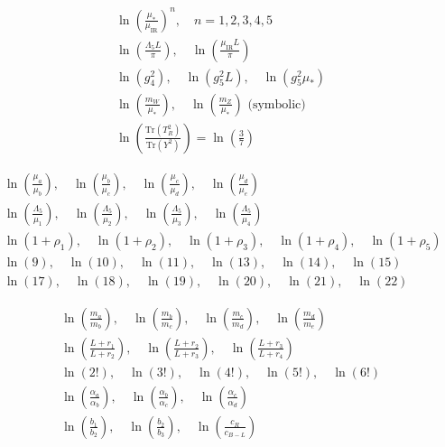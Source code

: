 \documentclass[11pt,a4paper]{article}
\theoremstyle{definition}
\begin{document}
\begin{align}
\label{eq:log_ext_16}
&\ln\left(\frac{\mu_*}{\mu_{\text{IR}}}\right)^n, \quad n = 1, 2, 3, 4, 5 \\
\label{eq:log_ext_17}
&\ln\left(\frac{\Lambda_5 L}{\pi}\right), \quad \ln\left(\frac{\mu_{\text{IR}} L}{\pi}\right) \\
\label{eq:log_ext_18}
&\ln(g_4^2), \quad \ln(g_5^2 L), \quad \ln(g_5^2\mu_*) \\
\label{eq:log_ext_19}
&\ln\left(\frac{m_W}{\mu_*}\right), \quad \ln\left(\frac{m_Z}{\mu_*}\right) \text{ (symbolic)} \\
\label{eq:log_ext_20}
&\ln\left(\frac{\text{Tr}(T^2_R)}{\text{Tr}(Y^2)}\right) = \ln\left(\frac{3}{7}\right)
\end{align}

\begin{align}
\label{eq:log_ext_21}
&\ln\left(\frac{\mu_a}{\mu_b}\right), \quad \ln\left(\frac{\mu_b}{\mu_c}\right), \quad \ln\left(\frac{\mu_c}{\mu_d}\right), \quad \ln\left(\frac{\mu_d}{\mu_e}\right) \\
\label{eq:log_ext_22}
&\ln\left(\frac{\Lambda_5}{\mu_1}\right), \quad \ln\left(\frac{\Lambda_5}{\mu_2}\right), \quad \ln\left(\frac{\Lambda_5}{\mu_3}\right), \quad \ln\left(\frac{\Lambda_5}{\mu_4}\right) \\
\label{eq:log_ext_23}
&\ln(1 + \rho_1), \quad \ln(1 + \rho_2), \quad \ln(1 + \rho_3), \quad \ln(1 + \rho_4), \quad \ln(1 + \rho_5) \\
\label{eq:log_ext_24}
&\ln(9), \quad \ln(10), \quad \ln(11), \quad \ln(13), \quad \ln(14), \quad \ln(15) \\
\label{eq:log_ext_25}
&\ln(17), \quad \ln(18), \quad \ln(19), \quad \ln(20), \quad \ln(21), \quad \ln(22)
\end{align}

\begin{align}
\label{eq:log_ext_26}
&\ln\left(\frac{m_a}{m_b}\right), \quad \ln\left(\frac{m_b}{m_c}\right), \quad \ln\left(\frac{m_c}{m_d}\right), \quad \ln\left(\frac{m_d}{m_e}\right) \\
\label{eq:log_ext_27}
&\ln\left(\frac{L + r_1}{L + r_2}\right), \quad \ln\left(\frac{L + r_2}{L + r_3}\right), \quad \ln\left(\frac{L + r_3}{L + r_4}\right) \\
\label{eq:log_ext_28}
&\ln(2!), \quad \ln(3!), \quad \ln(4!), \quad \ln(5!), \quad \ln(6!) \\
\label{eq:log_ext_29}
&\ln\left(\frac{\alpha_a}{\alpha_b}\right), \quad \ln\left(\frac{\alpha_b}{\alpha_c}\right), \quad \ln\left(\frac{\alpha_c}{\alpha_d}\right) \\
\label{eq:log_ext_30}
&\ln\left(\frac{b_1}{b_2}\right), \quad \ln\left(\frac{b_2}{b_3}\right), \quad \ln\left(\frac{c_R}{c_{B-L}}\right)
\end{align}
\end{document}
